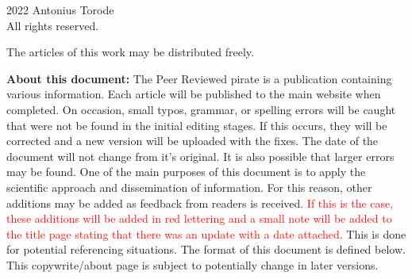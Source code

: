\onecolumn
	\begingroup
	\footnotesize
	\parindent 0pt
	\parskip \baselineskip
	\textcopyright{} 2022 Antonius Torode \\
	All rights reserved.
	
	The articles of this work may be distributed freely. 
	
	
	\textbf{About this document:} The Peer Reviewed pirate is a publication containing various information. Each article will be published to the main website when completed. On occasion, small typos, grammar, or spelling errors will be caught that were not be found in the initial editing stages. If this occurs, they will be corrected and a new version will be uploaded with the fixes. The date of the document will not change from it's original. It is also possible that larger errors may be found. One of the main purposes of this document is to apply the scientific approach and dissemination of information. For this reason, other additions may be added as feedback from readers is received. \textcolor{Red}{If this is the case, these additions will be added in red lettering and a small note will be added to the title page stating that there was an update with a date attached.} This is done for potential referencing situations. The format of this document is defined below. This copywrite/about page is subject to potentially change in later versions.
	
\vspace{0.5cm}
	
